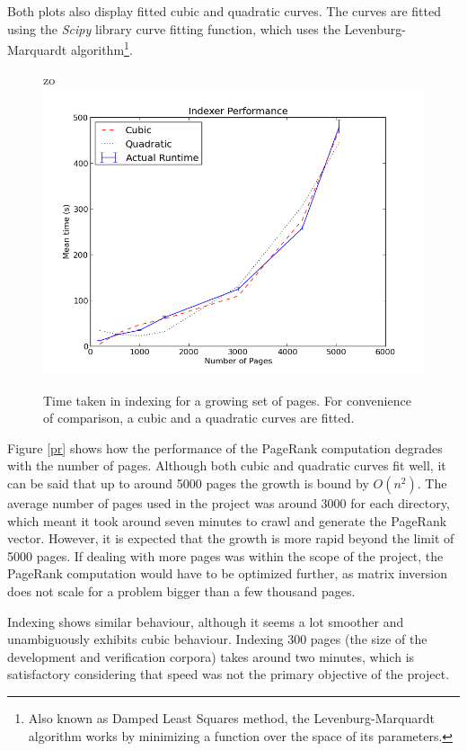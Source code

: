\documentclass[12pt,notitlepage,twoside]{scrreprt}
\begin{document}
Both plots also display fitted cubic and quadratic curves. The curves are fitted using the
\textit{Scipy} library curve fitting function, which uses the Levenburg-Marquardt
algorithm\footnote{Also known as Damped Least Squares method, the Levenburg-Marquardt
algorithm works by minimizing a function over the space of its parameters.}. 
\begin{figure}[h!]zo
  \centering
    \includegraphics[width=\linewidth]{figs/ind.png}
    \caption{Time taken in indexing for a growing set of pages. For convenience
	    of comparison, a cubic and a quadratic curves are fitted.\label{ind}}
\end{figure}
Figure \ref{pr} shows how the performance of the PageRank computation degrades with the
number of pages. Although both cubic and quadratic curves fit well, it can be said that
up to around 5000 pages the growth is bound by \(O(n^2)\). The average number of pages
used in the project was around 3000 for each directory, which meant it took around seven
minutes to crawl and generate the PageRank vector.  However, it is expected that the
growth is more rapid beyond the limit of 5000 pages. If dealing with more pages was within
the scope of the project, the PageRank computation would have to be optimized further, as
matrix inversion does not scale for a problem bigger than a few thousand pages.

Indexing shows similar behaviour, although it seems a lot smoother and unambiguously exhibits cubic
behaviour. Indexing 300 pages (the size of the development and verification corpora) takes around two minutes, which is satisfactory considering
that speed was not the primary objective of the project.
\end{document}
